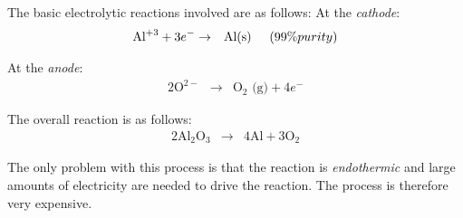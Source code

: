 The basic electrolytic reactions involved are as follows:
At the \emph{cathode}:
\begin{eqnarray*}
  \text{Al}^{+3} + 3e^{-} &\rightarrow& \text{Al(s)} \hspace{.5cm} (99\% purity)
  \end{eqnarray*}

At the \emph{anode}:
\begin{eqnarray*}
  2\text{O}^{2-} &\rightarrow& \text{O}_{2}\text{ (g)} + 4e^{-}
\end{eqnarray*}

The overall reaction is as follows:
\begin{eqnarray*}
  2\text{Al}_{2}\text{O}_{3} &\rightarrow& 4\text{Al} + 3\text{O}_{2}
\end{eqnarray*}

The only problem with this process is that the reaction is \textit{endothermic} and large amounts of electricity are needed to drive the reaction. The process is therefore very expensive.


